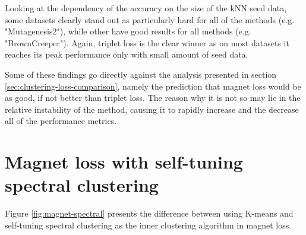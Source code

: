 Looking at the dependency of the accuracy on the size of the kNN seed data, some datasets clearly stand out as particularly hard for all of the methods (e.g. "Mutagenesis2"), while other have good results for all methods (e.g. "BrownCreeper"). Again, triplet loss is the clear winner as on most datasets it reaches its peak performance only with small amount of seed data.

Some of these findings go directly against the analysis presented in section \ref{sec:clustering-loss-comparison}, namely the prediction that magnet loss would be as good, if not better than triplet loss. The reason why it is not so may lie in the relative instability of the method, causing it to rapidly increase and the decrease all of the performance metrics.

\section{Magnet loss with self-tuning spectral clustering}\label{sec:magnet-spectral}

Figure \ref{fig:magnet-spectral} presents the difference between using K-means and self-tuning spectral clustering as the inner clustering algorithm in magnet loss.

